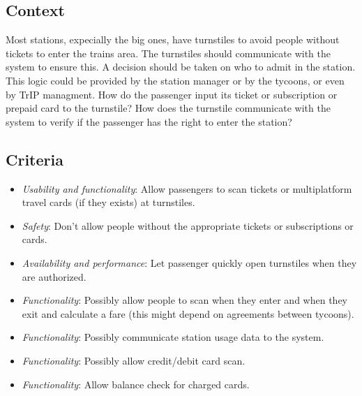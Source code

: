 \subsection*{Context}

Most stations, expecially the big ones, have turnstiles to avoid people without tickets to enter the trains area.
The turnstiles should communicate with the system to ensure this. A decision should be taken on who to admit in the station.
This logic could be provided by the station manager or by the tycoons, or even by TrIP managment.
How do the passenger input its ticket or subscription or prepaid card to the turnstile?
How does the turnstile communicate with the system to verify if the passenger has the right to enter the station?

\subsection*{Criteria}
\begin{itemize}
    \item \textit{Usability and functionality}: Allow passengers to scan tickets or multiplatform travel cards (if they exists) at turnstiles.
    \item \textit{Safety}: Don't allow people without the appropriate tickets or subscriptions or cards.
    \item \textit{Availability and performance}: Let passenger quickly open turnstiles when they are authorized.
    \item \textit{Functionality}: Possibly allow people to scan when they enter and when they exit and calculate a fare (this might depend on agreements between tycoons). 
    \item \textit{Functionality}: Possibly communicate station usage data to the system.
    \item \textit{Functionality}: Possibly allow credit/debit card scan.
    \item \textit{Functionality}: Allow balance check for charged cards.
\end{itemize}
    

